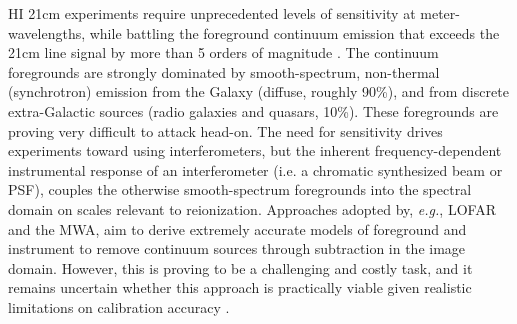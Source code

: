 \documentclass[preprint]{aastex}
\begin{document}
HI 21cm experiments require unprecedented levels of sensitivity at meter-wavelengths, 
while battling the foreground continuum emission that exceeds the 21cm line signal by 
more than 5 orders of magnitude
\citep{santos_et_al2005,pritchard_loeb2012,pober_et_al2013b}. The
continuum foregrounds are strongly dominated by smooth-spectrum,
non-thermal (synchrotron) emission from the Galaxy (diffuse, roughly
90\%), and from discrete extra-Galactic sources (radio galaxies and
quasars, 10\%).  These foregrounds are proving very difficult to
attack head-on.  The need for sensitivity drives experiments toward
using interferometers, but the inherent frequency-dependent
instrumental response of an interferometer (i.e. a chromatic
synthesized beam or PSF), couples the otherwise smooth-spectrum
foregrounds into the spectral domain on scales relevant to
reionization.  Approaches adopted by, {\em e.g.}, LOFAR and the
MWA, aim to derive extremely accurate models of foreground and
instrument to remove continuum sources through subtraction
in the image domain. However, this is proving to be a challenging and
costly task, and it remains uncertain whether this approach is
practically viable given realistic limitations on calibration accuracy
\citep{Datta_2010}.
\end{document}
